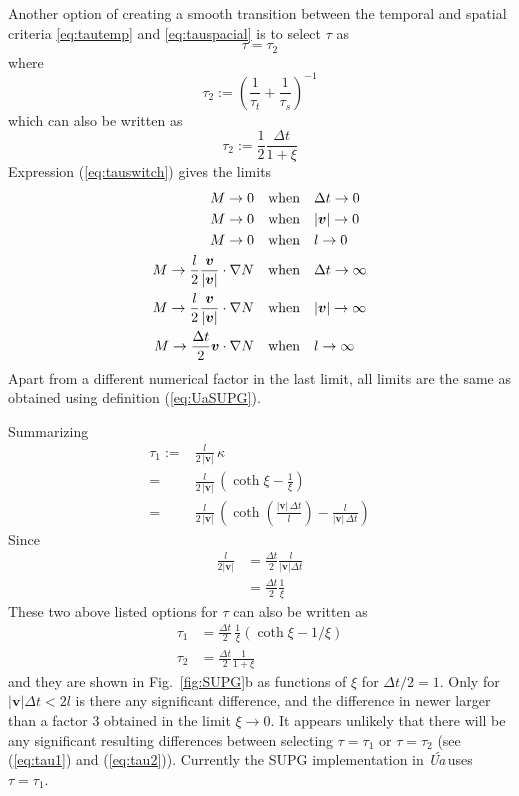 \documentclass[10pt,a4paper]{book}
\newcommand{\Ua}{\textsl{\'Ua}\,}
\begin{document}
Another option of creating a smooth transition between the temporal
and spatial criteria \ref{eq:tautemp} and \ref{eq:tauspacial} is to select $\tau$ as
\[
\tau=\tau_2
\]
where
\begin{equation}
  \tau_2:=\left ( \frac{1}{\tau_t} + \frac{1}{\tau_s} \right )^{-1}
\end{equation}
which can also be written as
\begin{equation}
  \tau_2:=\frac{1}{2} \frac{\Delta t}{1+ \xi}
\label{eq:tauswitch}
\end{equation}
Expression (\ref{eq:tauswitch}) gives the limits
\begin{align}
M \to 0 &\quad \hbox{when} \quad \Delta t \to 0 \nonumber \\
M \to 0 &\quad \hbox{when} \quad  |\bm{v}| \to 0 \nonumber \\
M \to 0 &\quad \hbox{when} \quad  l \to 0 \nonumber \\
M \to \frac{l}{2} \frac{\bm{v}}{|\bm{v}|} \cdot \nabla N  &\quad \hbox{when} \quad \Delta t \to \infty \nonumber\\
M \to \frac{l}{2} \frac{\bm{v}}{|\bm{v}|} \cdot \nabla N  &\quad \hbox{when} \quad |\bm{v}| \to \infty \nonumber \\
M \to \frac{\Delta t}{2} \bm{v} \cdot \nabla N &\quad \hbox{when} \quad l \to \infty \label{eq:linf2}
\end{align}
Apart from a different numerical factor in the last limit, all limits
are the same as obtained using definition (\ref{eq:UaSUPG}). 



Summarizing
\begin{align*}
  \tau_1 :=& \frac{l}{2 \, |\bm{v}|} \, \kappa  \\
  =& \frac{l}{2 \, |\bm{v}|} \,  ( \coth \xi - \frac{1}{\xi} )  \\
            =& \frac{l}{2 \, |\bm{v}|} \,  \left ( \coth \left (\frac{|\bm{v}| \, \Delta t}{l} \right ) - \frac{l}{|\bm{v}| \, \Delta t} \right ) 
\end{align*}
Since
\begin{align*}
  \frac{l}{2 | \bm{v} |} &= \frac{\Delta t}{2} \frac{l}{|\bm{v}| \Delta t} \\
                        &= \frac{\Delta t}{2} \frac{1}{\xi}
\end{align*}
These two above listed options for $\tau$ can also be written as
\begin{align}
\tau_1&=\frac{\Delta t}{2} \, \frac{1}{\xi} \left (\coth \xi - 1/\xi \right ) \label{eq:tau1} \\
\tau_2&=\frac{\Delta t}{2} \frac{1}{1+\xi} \label{eq:tau2}
\end{align}
and they are shown in Fig.~\ref{fig:SUPG}b as functions of $\xi$ for $\Delta t/2=1$. Only
for $|\bm{v}| \Delta t < 2 l$ is there any significant difference, and
the difference in newer larger than a factor 3 obtained in the limit
$\xi \to 0$.  It appears unlikely that there will be any significant
resulting differences between selecting $\tau=\tau_1$ or $\tau=\tau_2$
(see (\ref{eq:tau1}) and (\ref{eq:tau2})). Currently the SUPG
implementation in \Ua uses $\tau=\tau_1$.
\end{document}
